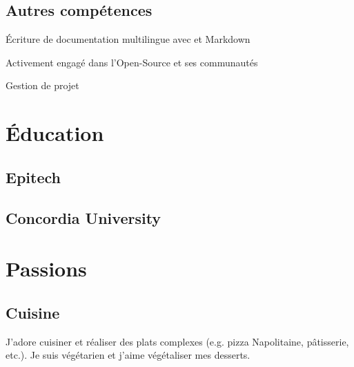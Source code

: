 \documentclass[
  french,
  a4paper
]{resume-openfont}
\begin{document}
\begin{minipage}[t]{0.31\textwidth}
\subsection{Autres compétences}
\vspace{2pt}
\vspace{\topsep} %
\begin{tightemize}
  \item Écriture de documentation multilingue avec  et Markdown
  \item Activement engagé dans l'Open-Source et ses communautés
  \item Gestion de projet
\end{tightemize}



\section{Éducation}

\subsection{Epitech}
\subtitle{Master en Informatique\\Major de promotion}
\sectionsep

\subsection{Concordia University}
\subtitle{Étudiant international en informatique, niveau master}


\section{Passions}

\subsection{Cuisine}
J'adore cuisiner et réaliser des plats complexes (e.g. pizza Napolitaine, pâtisserie, etc.). Je suis végétarien et j'aime végétaliser mes desserts.

\sectionsep


\end{minipage}
\end{document}
